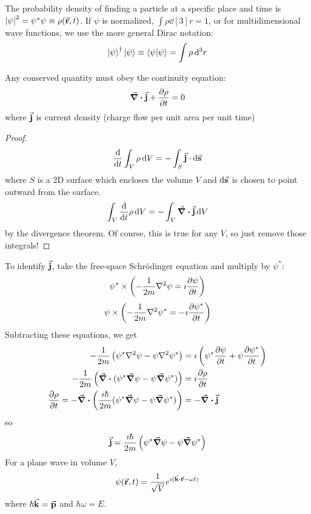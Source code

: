 \documentclass[a4paper,twoside,master.tex]{subfiles}
\begin{document}

The probability density of finding a particle at a specific place and time is $ \abs{\psi}^2 = \psi^* \psi \equiv \rho(\va{r}, t) $. If $ \psi $ is normalized, $ \int \rho \dd[3]{r} = 1 $, or for multidimensional wave functions, we use the more general Dirac notation:
\begin{equation}
    \ket{\psi}^\dagger\ket{\psi} \equiv\bra{\psi}\ket{\psi} = \int \rho \dd[3]{r}
\end{equation}

Any conserved quantity must obey the continuity equation:
\begin{equation}
    \div{\va{j}} + \pdv{\rho}{t} = 0
\end{equation}
where $ \va{j} $ is current density (charge flow per unit area per unit time)
\begin{proof}
    \begin{equation}
        \dv{t} \int_{V} \rho \dd{V} = -\int_{S} \va{j} \cdot \dd{\va{s}}
    \end{equation}
    where $ S $ is a 2D surface which encloses the volume $ V $ and $ \dd{\va{s}} $ is chosen to point outward from the surface.
    \begin{equation}
        \int_V \dv{t} \rho \dd{V} = - \int_V \div{\va{j}} \dd{V}
    \end{equation}
    by the divergence theorem. Of course, this is true for any $ V $, so just remove those integrals!
\end{proof}
To identify $ \va{j} $, take the free-space Schr\"odinger equation and multiply by $ \psi^* $:
\begin{equation}
    \psi^* \times \left( - \frac{1}{2m} \laplacian{\psi} = \imath \pdv{\psi}{t} \right)
\end{equation}
\begin{equation}
    \psi \times \left( - \frac{1}{2m} \laplacian{\psi^*} = -\imath \pdv{\psi^*}{t} \right)
\end{equation}
Subtracting these equations, we get
\begin{align}
    - \frac{1}{2m} \left( \psi^* \laplacian{\psi} - \psi \laplacian{\psi^*} \right) &= \imath \left( \psi^* \pdv{\psi}{t} + \psi \pdv{\psi^*}{t} \right)\\
    - \frac{1}{2m} \left( \div{(\psi^* \grad{\psi} - \psi \grad{\psi^*})} \right) &= \imath \pdv{\rho}{t}\\
    \pdv{\rho}{t} = - \div{\left( \frac{\imath \hbar}{2m} (\psi^* \grad{\psi} - \psi \grad{\psi^*}) \right)} &= - \div{\va{j}} \\
\end{align}
so
\begin{equation}
    \va{j} = \frac{\imath \hbar}{2m} \left( \psi^* \grad{\psi} - \psi \grad{\psi^*} \right)
\end{equation}
For a plane wave in volume $ V $,
\begin{equation}
    \psi(\va{r}, t) = \frac{1}{\sqrt{V}} e^{\imath (\va{k} \vdot \va{r} - \omega t)}
\end{equation}
where $ \hbar \va{k} = \va{p} $ and $ \hbar \omega = E $.
\end{document}
